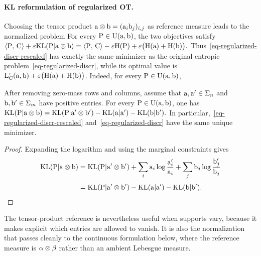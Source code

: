 \paragraph{KL reformulation of regularized OT.}
Choosing the tensor product $\mathrm{a} \otimes \mathrm{b} = (\mathrm{a}_i \mathrm{b}_j)_{i,j}$ as reference measure leads to the normalized problem
For every $\mathrm{P}\in\mathrm{U}(\mathrm{a},\mathrm{b})$, the two objectives satisfy
\(\langle \mathrm{P},\,\mathrm{C}\rangle+\varepsilon\mathrm{KL}(\mathrm{P}|\mathrm{a}\otimes\mathrm{b}) = \langle \mathrm{P},\,\mathrm{C}\rangle-\varepsilon\mathrm{H}(\mathrm{P}) +\varepsilon\bigl(\mathrm{H}(\mathrm{a})+\mathrm{H}(\mathrm{b})\bigr).\)
Thus~\eqref{eq-regularized-discr-rescaled} has exactly the same minimizer as the original entropic problem~\eqref{eq-regularized-discr}, while its optimal value is
\(
\mathrm{L}_{\mathrm{C}}^\varepsilon(\mathrm{a},\mathrm{b})+\varepsilon\bigl(\mathrm{H}(\mathrm{a})+\mathrm{H}(\mathrm{b})\bigr)
\).
Indeed, for every $\mathrm{P}\in\mathrm{U}(\mathrm{a},\mathrm{b})$,
\begin{prop}\label{prop-kl-shift}
After removing zero-mass rows and columns, assume that $\mathrm{a},\mathrm{a}'\in\Sigma_n$ and $\mathrm{b},\mathrm{b}'\in\Sigma_m$ have positive entries. For every $\mathrm{P} \in \mathrm{U}(\mathrm{a},\mathrm{b})$, one has
\(\mathrm{KL}(\mathrm{P}|\mathrm{a} \otimes \mathrm{b}) = \mathrm{KL}(\mathrm{P}|\mathrm{a}' \otimes \mathrm{b}') - \mathrm{KL}(\mathrm{a}|\mathrm{a}') - \mathrm{KL}(\mathrm{b}|\mathrm{b}').\)
In particular,~\eqref{eq-regularized-discr-rescaled} and~\eqref{eq-regularized-discr} have the same unique minimizer.
\end{prop}
\begin{proof}
Expanding the logarithm and using the marginal constraints gives
\begin{align*}
\mathrm{KL}(\mathrm{P}|\mathrm{a}\otimes\mathrm{b})
&=
\mathrm{KL}(\mathrm{P}|\mathrm{a}'\otimes\mathrm{b}')
+
\sum_i \mathrm{a}_i\log\frac{\mathrm{a}_i'}{\mathrm{a}_i}
+
\sum_j \mathrm{b}_j\log\frac{\mathrm{b}_j'}{\mathrm{b}_j} \\[.25em]
&=
\mathrm{KL}(\mathrm{P}|\mathrm{a}'\otimes\mathrm{b}')
-\mathrm{KL}(\mathrm{a}|\mathrm{a}')-\mathrm{KL}(\mathrm{b}|\mathrm{b}').
\end{align*}
\end{proof}
The tensor-product reference is nevertheless useful when supports vary, because it makes explicit which entries are allowed to vanish. It is also the normalization that passes cleanly to the continuous formulation below, where the reference measure is $\alpha\otimes\beta$ rather than an ambient Lebesgue measure.

